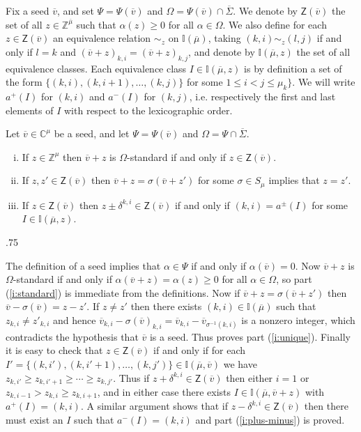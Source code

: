 \documentclass[11pt,fleqn]{amsart}
\makeatletter
\renewcommand\proofname{Proof}
\renewenvironment{proof}[1][\textit{\proofname}]{\par
 \pushQED{\qed}%
 \normalfont \topsep.75\paraskip\relax
 \trivlist
 \item[\hskip\labelsep
 \itshape
 #1\@addpunct{.}]\ignorespaces
}{%
 \popQED\endtrivlist\@endpefalse
}
\newcounter{para}[section]
\newcommand\CC{\mathbb C}
\newcommand\ZZ{\mathbb Z}
\newcommand\II{\mathbb I}
\newcommand\Z{\mathsf Z}
\newcommand\vv{\overline{v}}
\makeatother
\begin{document}
Fix a seed $\vv$, and set $\Psi = \Psi(\vv)$ and $\Omega = \Psi(\vv) \cap
\overline \Sigma$. We denote by $\Z(\vv)$ the set of all $z \in \ZZ^{\overline 
\mu}$ such that $\alpha(z) \geq 0$ for all $\alpha \in \Omega$. We also define
for each $z \in \Z(\vv)$ an equivalence relation $\sim_z$ on $\II(\overline 
\mu)$, taking $(k,i) \sim_z (l,j)$ if and only if $l = k$ and 
$(\vv + z)_{k,i} = (\vv + z)_{k,j}$, and denote by $\II(\overline \mu, z)$
the set of all equivalence classes. Each equivalence class $I \in \II(\overline
\mu, z)$ is by definition a set of the form $\{(k,i), (k,i+1), \ldots, (k,j)\}$
for some $1 \leq i < j \leq \mu_k\}$. We will write $a^+(I)$ for $(k,i)$ and 
$a^-(I)$ for $(k,j)$, i.e. respectively the first and last elements of $I$ 
with respect to the lexicographic order. 
\begin{Lemma}
\label{L:seed-varia}
Let $\vv \in \CC^\mu$ be a seed, and let $\Psi = \Psi(\vv)$ and $\Omega = 
\Psi \cap \overline \Sigma$.
\begin{enumerate}[(i)]
\item
\label{i:standard}
If $z \in \ZZ^\mu$ then $\vv + z$ is $\Omega$-standard if and only if $z \in 
\Z(\vv)$.

\item
\label{i:unique}
If $z, z' \in \Z(\vv)$ then $\vv + z = \sigma(\vv + z')$ for some $\sigma \in
S_\mu$ implies that $z = z'$.

\item
\label{i:plus-minus}
If $z \in \Z(\vv)$ then $z \pm \delta^{k,i} \in \Z(\vv)$ if and only if
$(k,i) = a^\pm(I)$ for some $I \in \II(\overline \mu, z)$.
\end{enumerate}
\end{Lemma}
\begin{proof}
The definition of a seed implies that $\alpha \in \Psi$ if and only if 
$\alpha(\vv) = 0$. Now $\vv + z$ is $\Omega$-standard if and only if 
$\alpha(\vv + z) = \alpha(z) \geq 0$ for all $\alpha \in \Omega$, so part
(\ref{i:standard}) is immediate from the definitions. Now if $\vv + z = 
\sigma(\vv + z')$ then $\vv - \sigma(\vv) = z - z'$. If $z \neq z'$ then there
exists $(k,i) \in \II(\overline \mu)$ such that $z_{k,i} \neq z'_{k,i}$ and 
hence $\vv_{k,i} - \sigma(\vv)_{k,i} = \vv_{k,i} - \vv_{\sigma^{-1}(k,i)}$
is a nonzero integer, which contradicts the hypothesis that $\vv$ is a seed.
Thus proves part (\ref{i:unique}). Finally it is easy to check that $z \in 
\Z(\vv)$ if and only if for each $I' = \{(k,i'), (k,i'+1), \ldots, (k,j')\} \in
\II(\overline \mu, \vv)$ we have $z_{k,i'} \geq z_{k,i'+1} \geq \cdots \geq
z_{k,j'}$. Thus if $z + \delta^{k,i} \in \Z(\vv)$ then either $i = 1$ or
$z_{k,i-1} > z_{k,i} \geq z_{k,i+1}$, and in either case there exists $I \in
\II(\overline \mu, \vv + z)$ with $a^+(I) = (k,i)$. A similar argument shows
that if $z - \delta^{k,i} \in \Z(\vv)$ then there must exist an $I$ such that
$a^-(I) = (k,i)$ and part (\ref{i:plus-minus}) is proved.
\end{proof}
\end{document}
